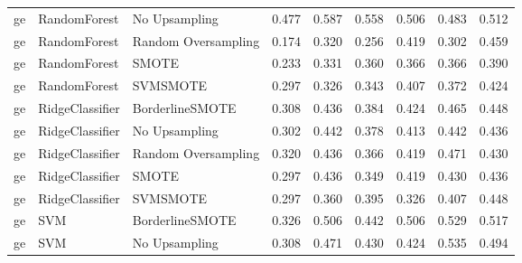 \begin{tabular}{lllllllll}
      ge &                 RandomForest &       No Upsampling &     0.477 &                     0.587 &                 0.558 &                  0.506 &                                   0.483 &     0.512 \\
      ge &                 RandomForest & Random Oversampling &     0.174 &                     0.320 &                 0.256 &                  0.419 &                                   0.302 &     0.459 \\
      ge &                 RandomForest &               SMOTE &     0.233 &                     0.331 &                 0.360 &                  0.366 &                                   0.366 &     0.390 \\
      ge &                 RandomForest &            SVMSMOTE &     0.297 &                     0.326 &                 0.343 &                  0.407 &                                   0.372 &     0.424 \\
      ge &              RidgeClassifier &     BorderlineSMOTE &     0.308 &                     0.436 &                 0.384 &                  0.424 &                                   0.465 &     0.448 \\
      ge &              RidgeClassifier &       No Upsampling &     0.302 &                     0.442 &                 0.378 &                  0.413 &                                   0.442 &     0.436 \\
      ge &              RidgeClassifier & Random Oversampling &     0.320 &                     0.436 &                 0.366 &                  0.419 &                                   0.471 &     0.430 \\
      ge &              RidgeClassifier &               SMOTE &     0.297 &                     0.436 &                 0.349 &                  0.419 &                                   0.430 &     0.436 \\
      ge &              RidgeClassifier &            SVMSMOTE &     0.297 &                     0.360 &                 0.395 &                  0.326 &                                   0.407 &     0.448 \\
      ge &                          SVM &     BorderlineSMOTE &     0.326 &                     0.506 &                 0.442 &                  0.506 &                                   0.529 &     0.517 \\
      ge &                          SVM &       No Upsampling &     0.308 &                     0.471 &                 0.430 &                  0.424 &                                   0.535 &     0.494 \\

\end{tabular}
